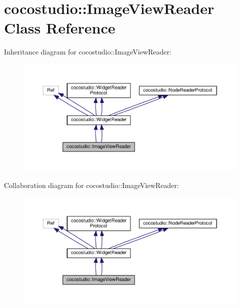 \hypertarget{classcocostudio_1_1ImageViewReader}{}\section{cocostudio\+:\+:Image\+View\+Reader Class Reference}
\label{classcocostudio_1_1ImageViewReader}


Inheritance diagram for cocostudio\+:\+:Image\+View\+Reader\+:
\nopagebreak
\begin{figure}[H]
\begin{center}
\leavevmode
\includegraphics[width=350pt]{classcocostudio_1_1ImageViewReader__inherit__graph}
\end{center}
\end{figure}


Collaboration diagram for cocostudio\+:\+:Image\+View\+Reader\+:
\nopagebreak
\begin{figure}[H]
\begin{center}
\leavevmode
\includegraphics[width=350pt]{classcocostudio_1_1ImageViewReader__coll__graph}
\end{center}
\end{figure}
